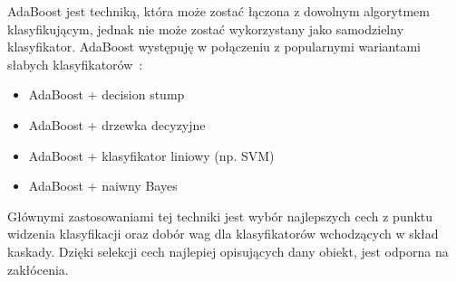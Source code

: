 AdaBoost jest techniką, która może zostać łączona z dowolnym algorytmem klasyfikującym, jednak nie może zostać wykorzystany jako samodzielny klasyfikator.
AdaBoost występuję w połączeniu z popularnymi wariantami słabych klasyfikatorów~\cite{szybka_detekcja_klesk}:
\begin{itemize}
    \item AdaBoost + decision stump
    \item AdaBoost + drzewka decyzyjne
    \item AdaBoost + klasyfikator liniowy (np. SVM)
    \item AdaBoost + naiwny Bayes
\end{itemize}
Głównymi zastosowaniami tej techniki jest wybór najlepszych cech z punktu widzenia klasyfikacji oraz dobór wag dla klasyfikatorów wchodzących w skład kaskady.
Dzięki selekcji cech najlepiej opisujących dany obiekt, jest odporna na zakłócenia.

